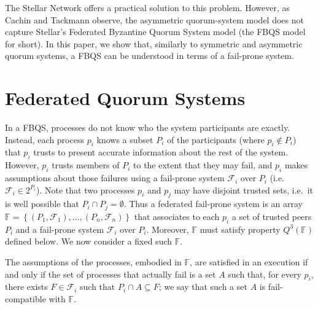 \documentclass[11pt]{article}
\begin{document}
The Stellar Network offers a practical solution to this problem. However, as Cachin and Tackmann observe, the asymmetric quorum-system model does not capture Stellar's Federated Byzantine Quorum System model (the FBQS model for short). In this paper, we show that, similarly to symmetric and asymmetric quorum systems, a FBQS can be understood in terms of a fail-prone system.



\section{Federated Quorum Systems}

In a FBQS, processes do not know who the system participants are exactly.
Instead, each process $p_i$ knows a subset $P_i$ of the participants (where $p_i\not\in P_i$) that $p_i$ trusts to present accurate information about the rest of the system.
However, $p_i$ trusts members of $P_i$ to the extent that they may fail, and $p_i$ makes assumptions about those failures using a fail-prone system $\mathcal{F}_i$ over $P_i$ (i.e.\ $\mathcal{F}_i\in 2^{P_i}$).
Note that two processes $p_i$ and $p_j$ may have disjoint trusted sets, i.e.\ it is well possible that $P_i\cap P_j=\emptyset$.
Thus a federated fail-prone system is an array $\mathbb{F}=\left\{\left(P_1,\mathcal{F}_1\right),...,\left(P_n,\mathcal{F}_n\right)\right\}$ that associates to each $p_i$ a set of trusted peers $P_i$ and a fail-prone system $\mathcal{F}_i$ over $P_i$. Moreover, $\mathbb{F}$ must satisfy property $Q^3(\mathbb{F})$ defined below.
We now consider a fixed such $\mathbb{F}$.

The assumptions of the processes, embodied in $\mathbb{F}$, are satisfied in an execution if and only if the set of processes that actually fail is a set $A$ such that, for every $p_i$, there exists $F\in\mathcal{F}_i$ such that $P_i\cap A \subseteq F$; we say that such a set $A$ is fail-compatible with $\mathbb{F}$.
\end{document}
